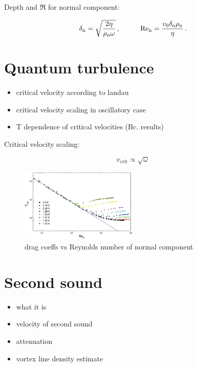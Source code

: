 Depth and $\Re$ for normal component:

\begin{equation}
\delta_{\mathrm{n}} = \sqrt{\frac{2\eta}{\rho_{\mathrm{n}}\omega}}\,,
\hspace{1cm}
\mathrm{Re}_{\mathrm{n}} = \frac{v_0 \delta_{\mathrm{n}} \rho_{\mathrm{n}}}{\eta}
\label{twofluid}\,.
\end{equation}


\section{Quantum turbulence}
\begin{itemize}
	\item critical velocity according to landau
	\item critical velocity scaling in oscillatory case
	\item T dependence of critical velocities (Bc. results)
\end{itemize}

Critical velocity scaling:

\begin{equation}
v_{\text{crit}} \propto \sqrt{\omega}
\end{equation}

\begin{figure}[h]
	\centering
	\includegraphics[width=0.5\textwidth]{graphics/theory/C-Re_normal}
	\caption{drag coeffs vs Reynolds number of normal component}
	\label{C-Re_normal}
\end{figure}

\section{Second sound}
\begin{itemize}
	\item what it is
	\item velocity of second sound
	\item attenuation
	\item vortex line density estimate
\end{itemize}

